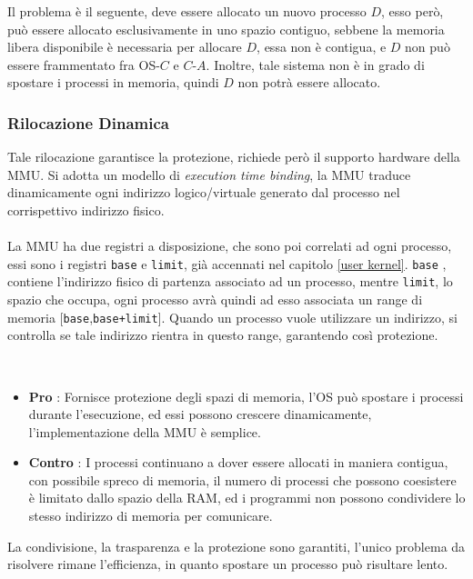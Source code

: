\documentclass[12pt, letterpaper]{article}
\newcommand{\code}[1]{\colorbox{light-gray}{\texttt{#1}}}
\newcommand{\acc}{\\\hphantom{}\\}
\begin{document}
Il problema è il seguente, deve essere allocato un nuovo processo \(D\), esso però, può essere allocato esclusivamente 
in uno spazio contiguo, sebbene la memoria libera disponibile è necessaria per allocare \(D\), essa non è 
contigua, e \(D\) non può essere frammentato fra OS-\(C\) e \(C\)-\(A\). Inoltre, tale sistema non è in grado di spostare 
i processi in memoria, quindi \(D\) non potrà essere allocato.
\subsubsection{Rilocazione Dinamica}
Tale rilocazione garantisce la protezione, richiede però il supporto hardware della MMU. 
Si adotta un modello di  \textit{execution time binding}, la MMU traduce dinamicamente ogni indirizzo 
logico/virtuale generato dal processo nel corrispettivo indirizzo fisico. \acc 
La MMU ha due registri a disposizione, che sono poi correlati ad ogni processo, essi sono i registri 
\code{base} e \code{limit}, già accennati nel capitolo \ref{user kernel}. \code{base} , contiene l'indirizzo fisico 
di partenza associato ad un processo, mentre \code{limit}, lo spazio che occupa, ogni processo avrà quindi 
ad esso associata un range di memoria [\code{base},\code{base+limit}]. Quando un processo vuole utilizzare 
un indirizzo, si controlla se tale indirizzo rientra in questo range, garantendo così protezione.
\begin{figure}[h]
\end{figure}\\
\begin{itemize}
    \item \textbf{Pro} : Fornisce protezione degli spazi di memoria, l'OS può spostare i processi durante l'esecuzione, ed 
    essi possono crescere dinamicamente, l'implementazione della MMU è semplice.
    \item \textbf{Contro} : I processi continuano a dover essere allocati in maniera contigua, con possibile spreco 
    di memoria, il numero di processi che possono coesistere è limitato dallo spazio della RAM, ed i programmi 
    non possono condividere lo stesso indirizzo di memoria per comunicare.
\end{itemize}
La condivisione, la trasparenza e la protezione sono garantiti, l'unico problema da risolvere rimane l'efficienza, in quanto 
spostare un processo può risultare lento.
\end{document}
